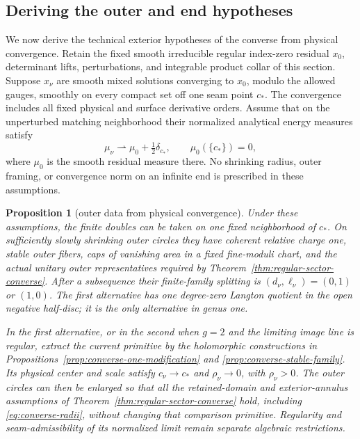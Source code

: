 \documentclass[11pt]{amsart}
\newtheorem{proposition}[theorem]{Proposition}
\theoremstyle{definition}
\theoremstyle{remark}
\theoremstyle{plain}
\begin{document}
\subsection{Deriving the outer and end hypotheses}
\label{sec:physical-sector-coverage}

We now derive the technical exterior hypotheses of the converse from
physical convergence. Retain the fixed smooth irreducible regular
index-zero residual $x_0$, determinant lifts, perturbations, and
integrable product collar of this section. Suppose $x_\nu$ are smooth
mixed solutions converging to $x_0$, modulo the allowed gauges,
smoothly on every compact set off one seam point $c_*$. The convergence
includes all fixed physical and surface derivative orders. Assume
that on the unperturbed matching neighborhood their normalized
analytical energy measures satisfy
\begin{equation}\label{eq:physical-primitive-defect}
 \mu_\nu\rightharpoonup\mu_0+\tfrac12\delta_{c_*},
                         \qquad \mu_0(\{c_*\})=0,
\end{equation}
where $\mu_0$ is the smooth residual measure there. No shrinking
radius, outer framing, or convergence norm on an infinite end is
prescribed in these assumptions.

\begin{proposition}[outer data from physical convergence]
\label{prop:automatic-outer-data}
Under these assumptions, the finite doubles can be taken on one
fixed neighborhood of $c_*$. On sufficiently slowly shrinking
outer circles they have coherent relative charge one, stable
outer fibers, caps of vanishing area in a fixed fine-moduli
chart, and the actual unitary outer representatives required
by Theorem~\ref{thm:regular-sector-converse}.
After a subsequence their finite-family splitting is
$(d_\nu,\ell_\nu)=(0,1)$ or $(1,0)$. The first alternative
has one degree-zero Langton quotient in the open negative
half-disc; it is the only alternative in genus one.

In the first alternative, or in the second when $g=2$ and
the limiting image line is regular, extract the current
primitive by the holomorphic constructions in
Propositions~\ref{prop:converse-one-modification} and
\ref{prop:converse-stable-family}. Its physical center and
scale satisfy $c_\nu\to c_*$ and $\rho_\nu\to0$, with
$\rho_\nu>0$. The outer circles can then be enlarged so
that all the retained-domain and exterior-annulus assumptions
of Theorem~\ref{thm:regular-sector-converse} hold, including
\eqref{eq:converse-radii}, without changing that comparison primitive.
Regularity and seam-admissibility of its normalized limit
remain separate algebraic restrictions.
\end{proposition}
\end{document}
